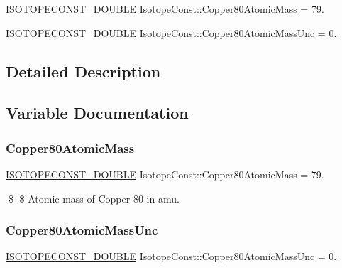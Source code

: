 \begin{DoxyCompactItemize}
\item 
\mbox{\hyperlink{group___isotope_const-_macros_ga8f45a7272ce02c0b4c65c44636ed719a}{I\+S\+O\+T\+O\+P\+E\+C\+O\+N\+S\+T\+\_\+\+D\+O\+U\+B\+LE}} \mbox{\hyperlink{group___isotope_const-_copper-_cu80_ga913117606dbeee96c2f8e999228071b5}{Isotope\+Const\+::\+Copper80\+Atomic\+Mass}} = 79.
\item 
\mbox{\hyperlink{group___isotope_const-_macros_ga8f45a7272ce02c0b4c65c44636ed719a}{I\+S\+O\+T\+O\+P\+E\+C\+O\+N\+S\+T\+\_\+\+D\+O\+U\+B\+LE}} \mbox{\hyperlink{group___isotope_const-_copper-_cu80_ga265384dd27eb3d82975a7e3113c06b26}{Isotope\+Const\+::\+Copper80\+Atomic\+Mass\+Unc}} = 0.
\end{DoxyCompactItemize}


\subsection{Detailed Description}


\subsection{Variable Documentation}
\mbox{\label{group___isotope_const-_copper-_cu80_ga913117606dbeee96c2f8e999228071b5}} 
\subsubsection{\texorpdfstring{Copper80\+Atomic\+Mass}{Copper80AtomicMass}}
{\footnotesize\ttfamily \mbox{\hyperlink{group___isotope_const-_macros_ga8f45a7272ce02c0b4c65c44636ed719a}{I\+S\+O\+T\+O\+P\+E\+C\+O\+N\+S\+T\+\_\+\+D\+O\+U\+B\+LE}} Isotope\+Const\+::\+Copper80\+Atomic\+Mass = 79.}

\$ \$ Atomic mass of Copper-\/80 in amu. \mbox{\label{group___isotope_const-_copper-_cu80_ga265384dd27eb3d82975a7e3113c06b26}} 
\subsubsection{\texorpdfstring{Copper80\+Atomic\+Mass\+Unc}{Copper80AtomicMassUnc}}
{\footnotesize\ttfamily \mbox{\hyperlink{group___isotope_const-_macros_ga8f45a7272ce02c0b4c65c44636ed719a}{I\+S\+O\+T\+O\+P\+E\+C\+O\+N\+S\+T\+\_\+\+D\+O\+U\+B\+LE}} Isotope\+Const\+::\+Copper80\+Atomic\+Mass\+Unc = 0.}

